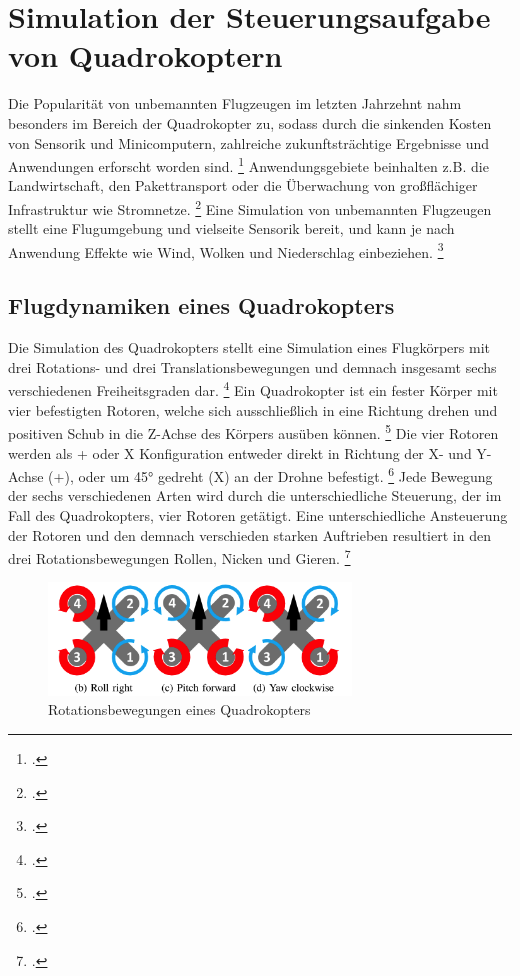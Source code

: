 \section{Simulation der Steuerungsaufgabe von Quadrokoptern}
Die Popularität von unbemannten Flugzeugen im letzten Jahrzehnt nahm besonders im Bereich der Quadrokopter zu, sodass durch die sinkenden Kosten von Sensorik und Minicomputern, zahlreiche zukunftsträchtige Ergebnisse und Anwendungen erforscht worden sind. \footcite[Vgl.][S. 1]{Koch.2018}
Anwendungsgebiete beinhalten z.B. die Landwirtschaft, den Pakettransport oder die Überwachung von großflächiger Infrastruktur wie Stromnetze. \footcite[Vgl.][S. 1]{Deshpande.2020}
Eine Simulation von unbemannten Flugzeugen stellt eine Flugumgebung und vielseite Sensorik bereit, und kann je nach Anwendung Effekte wie Wind, Wolken und Niederschlag einbeziehen. \footcite[Vgl.][S. 1496]{Hentati.2018}

\subsection{Flugdynamiken eines Quadrokopters}
Die Simulation des Quadrokopters stellt eine Simulation eines Flugkörpers mit drei Rotations- und drei Translationsbewegungen und demnach insgesamt sechs verschiedenen Freiheitsgraden dar. \footcite[Vgl.][S. 2]{Koch.2018}
Ein Quadrokopter ist ein fester Körper mit vier befestigten Rotoren, welche sich ausschließlich in eine Richtung drehen und positiven Schub in die Z-Achse des Körpers ausüben können. \footcite[Vgl.][S. 3]{Molchanov.2019}
Die vier Rotoren werden als + oder X Konfiguration entweder direkt in Richtung der X- und Y-Achse (+), oder um 45° gedreht (X) an der Drohne befestigt. \footcite[Vgl.][S. 2]{Koch.2018}
Jede Bewegung der sechs verschiedenen Arten wird durch die unterschiedliche Steuerung, der im Fall des Quadrokopters, vier Rotoren getätigt.
Eine unterschiedliche Ansteuerung der Rotoren und den demnach verschieden starken Auftrieben resultiert in den drei Rotationsbewegungen Rollen, Nicken und Gieren. \footcite[Vgl.][S. 2]{Koch.2018}
\begin{figure}[htb]
    \centering
    \includegraphics[height=3cm]{lib/graphics/Drone axis.png}
    \caption[Rotationsbewegungen eines Quadrokopters]{Rotationsbewegungen eines Quadrokopters\footnotemark}
    \label{abb:drone axis}
\end{figure}

